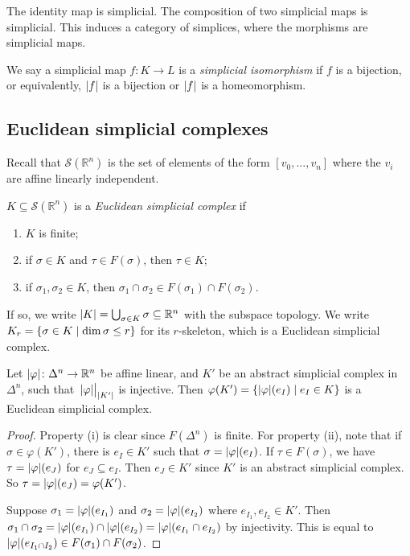 \begin{remark}
	The identity map is simplicial.
	The composition of two simplicial maps is simplicial.
	This induces a category of simplices, where the morphisms are simplicial maps.
\end{remark}
\begin{definition}
	We say a simplicial map \( f \colon K \to L \) is a \emph{simplicial isomorphism} if \( f \) is a bijection, or equivalently, \( \abs{f} \) is a bijection or \( \abs{f} \) is a homeomorphism.
\end{definition}

\subsection{Euclidean simplicial complexes}
Recall that \( \mathcal S(\mathbb R^n) \) is the set of elements of the form \( [v_0, \dots, v_n] \) where the \( v_i \) are affine linearly independent.
\begin{definition}
	\( K \subseteq \mathcal S(\mathbb R^n) \) is a \emph{Euclidean simplicial complex} if
	\begin{enumerate}
		\item \( K \) is finite;
		\item if \( \sigma \in K \) and \( \tau \in F(\sigma) \), then \( \tau \in K \);
		\item if \( \sigma_1, \sigma_2 \in K \), then \( \sigma_1 \cap \sigma_2 \in F(\sigma_1) \cap F(\sigma_2) \).
	\end{enumerate}
	If so, we write \( \abs{K} = \bigcup_{\sigma \in K} \sigma \subseteq \mathbb R^n \) with the subspace topology.
	We write \( K_r = \qty{\sigma \in K \mid \dim \sigma \leq r} \) for its \( r \)-skeleton, which is a Euclidean simplicial complex.
\end{definition}
\begin{proposition}
	Let \( \abs{\varphi} \colon \Delta^n \to \mathbb R^n \) be affine linear, and \( K' \) be an abstract simplicial complex in \( \Delta^n \), such that \( \eval{\abs{\varphi}}_{\abs{K'}} \) is injective.
	Then \( \varphi(K') = \qty{\abs{\varphi}(e_I) \mid e_I \in K} \) is a Euclidean simplicial complex.
\end{proposition}
\begin{proof}
	Property (i) is clear since \( F(\Delta^n) \) is finite.
	For property (ii), note that if \( \sigma \in \varphi(K') \), there is \( e_I \in K' \) such that \( \sigma = \abs{\varphi}(e_I) \).
	If \( \tau \in F(\sigma) \), we have \( \tau = \abs{\varphi}(e_J) \) for \( e_J \subseteq e_I \).
	Then \( e_J \in K' \) since \( K' \) is an abstract simplicial complex.
	So \( \tau = \abs{\varphi}(e_J) = \varphi(K') \).

	Suppose \( \sigma_1 = \abs{\varphi}(e_{I_1}) \) and \( \sigma_2 = \abs{\varphi}(e_{I_2}) \) where \( e_{I_1}, e_{I_2} \in K' \).
	Then \( \sigma_1 \cap \sigma_2 = \abs{\varphi}(e_{I_1}) \cap \abs{\varphi}(e_{I_2}) = \abs{\varphi}(e_{I_1} \cap e_{I_2}) \) by injectivity.
	This is equal to \( \abs{\varphi}(e_{I_1 \cap I_2}) \in F(\sigma_1) \cap F(\sigma_2) \).
\end{proof}
